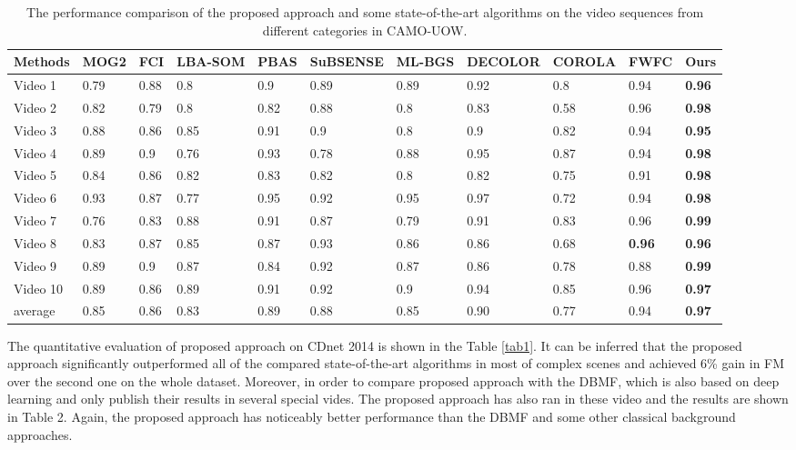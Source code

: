 \documentclass[journal]{IEEEtran}
\newcommand{\reftab}[1]{Table \ref{#1}}
\begin{document}
    
    \begin{table}[!t]
\centering
\caption{The performance comparison of the proposed approach and some state-of-the-art algorithms on the video sequences from different categories in CAMO-UOW.}
\label{tab3}
\begin{tabular}{lllllllllll}
\hline
Methods  & MOG2\cite{ZIVKOVIC2006773} & FCI\cite{Baf2008FCI}  & LBA-SOM\cite{LBA-SOM2008} & PBAS & SuBSENSE & ML-BGS\cite{ML-BGS2007} & DECOLOR\cite{DECOLOR2013}       & COROLA\cite{SHAKERI201628} & FWFC\cite{Li2018CAMO}          & Ours          \\ \hline
Video 1  & 0.79 & 0.88 & 0.8     & 0.9  & 0.89     & 0.89   & 0.92          & 0.8    & 0.94 & \textbf{0.96} \\
Video 2  & 0.82 & 0.79 & 0.8     & 0.82 & 0.88     & 0.8    & 0.83          & 0.58   & 0.96          & \textbf{0.98} \\
Video 3  & 0.88 & 0.86 & 0.85    & 0.91 & 0.9      & 0.8    & 0.9           & 0.82   & 0.94 & \textbf{0.95} \\
Video 4  & 0.89 & 0.9  & 0.76    & 0.93 & 0.78     & 0.88   & 0.95          & 0.87   & 0.94          & \textbf{0.98} \\
Video 5  & 0.84 & 0.86 & 0.82    & 0.83 & 0.82     & 0.8    & 0.82          & 0.75   & 0.91          & \textbf{0.98} \\
Video 6  & 0.93 & 0.87 & 0.77    & 0.95 & 0.92     & 0.95   & 0.97	      & 0.72   & 0.94          & \textbf{0.98}  \\
Video 7  & 0.76 & 0.83 & 0.88    & 0.91 & 0.87     & 0.79   & 0.91          & 0.83   & 0.96          & \textbf{0.99} \\
Video 8  & 0.83 & 0.87 & 0.85    & 0.87 & 0.93     & 0.86   & 0.86          & 0.68   & \textbf{0.96}          & \textbf{0.96} \\
Video 9  & 0.89 & 0.9  & 0.87    & 0.84 & 0.92     & 0.87   & 0.86          & 0.78   & 0.88          & \textbf{0.99} \\
Video 10 & 0.89 & 0.86 & 0.89    & 0.91 & 0.92     & 0.9    & 0.94          & 0.85   & 0.96          & \textbf{0.97} \\ \hline
average  & 0.85 & 0.86 & 0.83    & 0.89 & 0.88     & 0.85   & 0.90          & 0.77   & 0.94          & \textbf{0.97} \\ \hline
\end{tabular}
\end{table}




The quantitative evaluation of proposed approach on CDnet 2014 is shown in the \reftab{tab1}. 
It can be inferred that the proposed approach significantly outperformed all of the compared state-of-the-art algorithms in most of complex scenes and achieved 6\% gain in FM over the second one on the whole dataset. 
Moreover, in order to compare proposed approach with the DBMF, which is also based on deep learning and only publish their results in several special vides. 
The proposed approach has also ran in these video and the results are shown in Table 2. 
Again, the proposed approach has noticeably better performance than the DBMF and some other classical background approaches.
\end{document}
